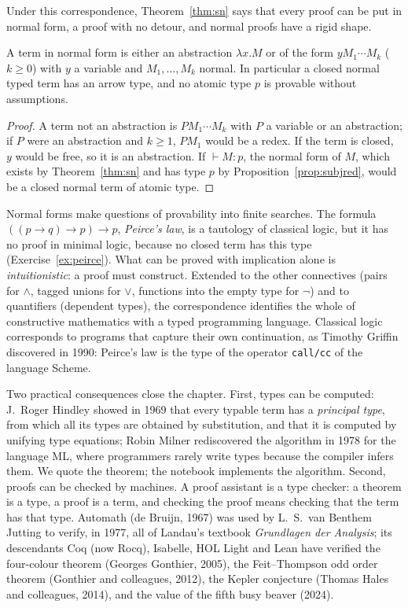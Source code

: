 Under this correspondence, Theorem~\ref{thm:sn} says that every proof can be put in normal form, a proof with no detour, and normal proofs have a rigid shape.

\begin{lemma}\label{lem:normalshape}
A term in normal form is either an abstraction $\lambda x.M$ or of the form $yM_1\cdots M_k$ ($k\ge0$) with $y$ a variable and $M_1,\dots,M_k$ normal. In particular a closed normal typed term has an arrow type, and no atomic type $p$ is provable without assumptions.
\end{lemma}

\begin{proof}
A term not an abstraction is $PM_1\cdots M_k$ with $P$ a variable or an abstraction; if $P$ were an abstraction and $k\ge1$, $PM_1$ would be a redex. If the term is closed, $y$ would be free, so it is an abstraction. If $\vdash M:p$, the normal form of $M$, which exists by Theorem~\ref{thm:sn} and has type $p$ by Proposition~\ref{prop:subjred}, would be a closed normal term of atomic type.
\end{proof}

Normal forms make questions of provability into finite searches. The formula $((p\to q)\to p)\to p$, \emph{Peirce's law}, is a tautology of classical logic, but it has no proof in minimal logic, because no closed term has this type (Exercise~\ref{ex:peirce}). What can be proved with implication alone is \emph{intuitionistic}: a proof must construct. Extended to the other connectives (pairs for $\wedge$, tagged unions for $\vee$, functions into the empty type for $\neg$) and to quantifiers (dependent types), the correspondence identifies the whole of constructive mathematics with a typed programming language. Classical logic corresponds to programs that capture their own continuation, as Timothy Griffin discovered in 1990: Peirce's law is the type of the operator \texttt{call/cc} of the language Scheme.

Two practical consequences close the chapter. First, types can be computed: J.~Roger Hindley showed in 1969 that every typable term has a \emph{principal type}, from which all its types are obtained by substitution, and that it is computed by unifying type equations; Robin Milner rediscovered the algorithm in 1978 for the language ML, where programmers rarely write types because the compiler infers them. We quote the theorem; the notebook implements the algorithm. Second, proofs can be checked by machines. A proof assistant is a type checker: a theorem is a type, a proof is a term, and checking the proof means checking that the term has that type. Automath (de Bruijn, 1967) was used by L.~S.~van Benthem Jutting to verify, in 1977, all of Landau's textbook \emph{Grundlagen der Analysis}; its descendants Coq (now Rocq), Isabelle, HOL Light and Lean have verified the four-colour theorem (Georges Gonthier, 2005), the Feit--Thompson odd order theorem (Gonthier and colleagues, 2012), the Kepler conjecture (Thomas Hales and colleagues, 2014), and the value of the fifth busy beaver (2024).

